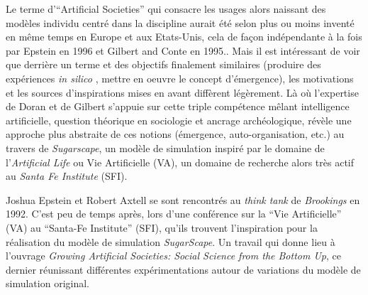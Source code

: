Le terme d'\foreignquote{english}{Artificial Societies} qui consacre les usages alors naissant des modèles individu centré dans la discipline aurait été selon \textcite{Gilbert2000a} plus ou moins inventé en même temps en Europe et aux Etats-Unis, cela de façon indépendante à la fois par Epstein en 1996 et Gilbert and Conte en 1995.. Mais il est intéressant de voir que derrière un terme et des objectifs finalement similaires (produire des expériences \textit{in silico} , mettre en oeuvre le concept d'émergence), les motivations et les sources d'inspirations mises en avant diffèrent légèrement. Là où l'expertise de Doran et de Gilbert s'appuie sur cette triple compétence mêlant intelligence artificielle, question théorique en sociologie et ancrage archéologique,  \textcite[17-19]{Epstein1996} révèle une approche plus abstraite de ces notions (émergence, auto-organisation, etc.) au travers de \textit{Sugarscape}, un modèle de simulation inspiré par le domaine de l'\textit{Artificial Life} ou Vie Artificielle (VA), un domaine de recherche alors très actif au \textit{Santa Fe Institute} (SFI).


Joshua Epstein et Robert Axtell se sont rencontrés au \textit{think tank} de \textit{Brookings} en 1992. C'est peu de temps après, lors d'une conférence sur la \enquote{Vie Artificielle} (VA) au \foreignquote{english}{Santa-Fe Institute} (SFI), qu'ils trouvent l'inspiration pour la réalisation du modèle de simulation \textit{SugarScape}. Un travail qui donne lieu à l'ouvrage \textit{Growing Artificial Societies: Social Science from the Bottom Up}, ce dernier réunissant différentes expérimentations autour de variations du modèle de simulation original.

